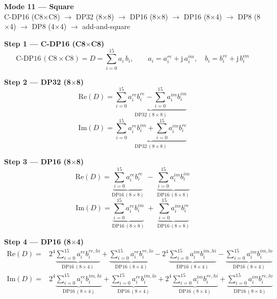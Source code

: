 \documentclass[fleqn]{article}
\newcommand{\DPop}[3]{\mathrm{DP#1}\,(#2\!\times\!#3)}
\begin{document}
\begin{center}
{\LARGE \textbf{Mode 11 --- Square}}\\[4pt]
{\large C-DP16 (C8$\times$C8) $\rightarrow$ DP32 (8$\times$8) $\rightarrow$ DP16 (8$\times$8) $\rightarrow$ DP16 (8$\times$4) $\rightarrow$ DP8 (8$\times$4) $\rightarrow$ DP8 (4$\times$4) $\rightarrow$ add-and-square}
\end{center}

\vspace{0.1em}

\textbf{Step 1 --- C-DP16 (C8$\times$C8)}
\[
\text{C-DP16}\,(\mathrm{C8}\!\times\!\mathrm{C8}) = D = \sum_{i=0}^{15} a_i \, b_i, \qquad
a_i = a_i^{re} + \mathrm{j}\,a_i^{im}, \quad
b_i = b_i^{re} + \mathrm{j}\,b_i^{im}
\]

\textbf{Step 2 --- DP32 (8$\times$8)}
\[
\mathrm{Re}(D) = \underbrace{\sum_{i=0}^{15} a_i^{re} b_i^{re}
  - \sum_{i=0}^{15} a_i^{im} b_i^{im}}_{\DPop{32}{8}{8}}
\]
\[
\mathrm{Im}(D) = \underbrace{\sum_{i=0}^{15} a_i^{re} b_i^{im}
  + \sum_{i=0}^{15} a_i^{im} b_i^{re}}_{\DPop{32}{8}{8}}
\]

\textbf{Step 3 --- DP16 (8$\times$8)}
\[
\mathrm{Re}(D) = \underbrace{\sum_{i=0}^{15} a_i^{re} b_i^{re}}_{\DPop{16}{8}{8}}
  \; - \; \underbrace{\sum_{i=0}^{15} a_i^{im} b_i^{im}}_{\DPop{16}{8}{8}}
\]
\[
\mathrm{Im}(D) = \underbrace{\sum_{i=0}^{15} a_i^{re} b_i^{im}}_{\DPop{16}{8}{8}}
  \; + \; \underbrace{\sum_{i=0}^{15} a_i^{im} b_i^{re}}_{\DPop{16}{8}{8}}
\]

\textbf{Step 4 --- DP16 (8$\times$4)}
\begin{align*}
\mathrm{Re}(D) = {}
  & 2^{4} \underbrace{\sum_{i=0}^{15} a_i^{re} b_i^{re,hi}}_{\DPop{16}{8}{4}}
  + \underbrace{\sum_{i=0}^{15} a_i^{re} b_i^{re,lo}}_{\DPop{16}{8}{4}}
  - 2^{4} \underbrace{\sum_{i=0}^{15} a_i^{im} b_i^{im,hi}}_{\DPop{16}{8}{4}}
  - \underbrace{\sum_{i=0}^{15} a_i^{im} b_i^{im,lo}}_{\DPop{16}{8}{4}}
\end{align*}
\begin{align*}
\mathrm{Im}(D) = {}
  & 2^{4} \underbrace{\sum_{i=0}^{15} a_i^{re} b_i^{im,hi}}_{\DPop{16}{8}{4}}
  + \underbrace{\sum_{i=0}^{15} a_i^{re} b_i^{im,lo}}_{\DPop{16}{8}{4}}
  + 2^{4} \underbrace{\sum_{i=0}^{15} a_i^{im} b_i^{re,hi}}_{\DPop{16}{8}{4}}
  + \underbrace{\sum_{i=0}^{15} a_i^{im} b_i^{re,lo}}_{\DPop{16}{8}{4}}
\end{align*}
\end{document}
